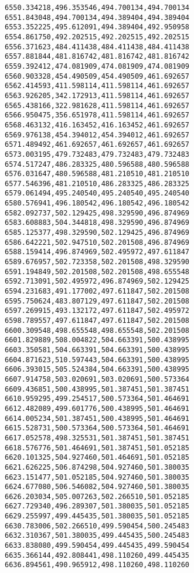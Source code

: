 \documentclass[11pt]{article}
\begin{document}
\begin{Verbatim}[commandchars=\\\{\}]
6550.334218,496.353546,494.700134,494.700134
6551.843048,494.700134,494.389404,494.389404
6553.352225,495.612091,494.389404,492.950958
6554.861750,492.202515,492.202515,492.202515
6556.371623,484.411438,484.411438,484.411438
6557.881844,481.816742,481.816742,481.816742
6559.392412,474.081909,474.081909,474.081909
6560.903328,454.490509,454.490509,461.692657
6562.414593,411.598114,411.598114,461.692657
6563.926205,342.172913,411.598114,461.692657
6565.438166,322.981628,411.598114,461.692657
6566.950475,356.651978,411.598114,461.692657
6568.463132,416.163452,416.163452,461.692657
6569.976138,454.394012,454.394012,461.692657
6571.489492,461.692657,461.692657,461.692657
6573.003195,479.732483,479.732483,479.732483
6574.517247,486.283325,480.596588,480.596588
6576.031647,480.596588,481.210510,481.210510
6577.546396,481.210510,486.283325,486.283325
6579.061494,495.240540,495.240540,495.240540
6580.576941,496.180542,496.180542,496.180542
6582.092737,502.129425,498.329590,496.874969
6583.608883,504.344818,498.329590,496.874969
6585.125377,498.329590,502.129425,496.874969
6586.642221,502.947510,502.201508,496.874969
6588.159414,496.874969,502.495972,497.611847
6589.676957,502.723358,502.201508,498.329590
6591.194849,502.201508,502.201508,498.655548
6592.713091,502.495972,496.874969,502.129425
6594.231683,491.177002,497.611847,502.201508
6595.750624,483.807129,497.611847,502.201508
6597.269915,493.132172,497.611847,502.495972
6598.789557,497.611847,497.611847,502.201508
6600.309548,498.655548,498.655548,502.201508
6601.829889,508.004822,504.663391,500.438995
6603.350581,504.663391,504.663391,500.438995
6604.871623,510.597443,504.663391,500.438995
6606.393015,505.524384,504.663391,500.438995
6607.914758,503.020691,503.020691,500.573364
6609.436851,500.438995,501.387451,501.387451
6610.959295,499.254517,500.573364,501.464691
6612.482089,499.601776,500.438995,501.464691
6614.005234,501.387451,500.438995,501.464691
6615.528731,500.573364,500.573364,501.464691
6617.052578,498.325531,501.387451,501.387451
6618.576776,501.464691,501.387451,501.052185
6620.101325,504.927460,501.464691,501.052185
6621.626225,506.874298,504.927460,501.380035
6623.151477,501.052185,504.927460,501.380035
6624.677080,506.546082,504.927460,501.380035
6626.203034,505.007263,502.266510,501.052185
6627.729340,496.289307,501.380035,501.052185
6629.255997,499.445435,501.380035,501.052185
6630.783006,502.266510,499.590454,500.245483
6632.310367,501.380035,499.445435,500.245483
6633.838080,499.590454,499.445435,499.590454
6635.366144,492.808441,498.110260,499.445435
6636.894561,490.965912,498.110260,498.110260

\end{Verbatim}
\end{document}
